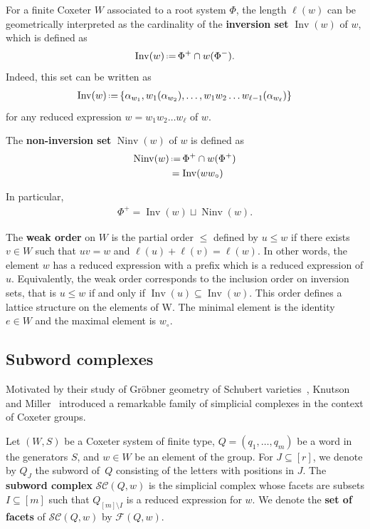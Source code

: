 \documentclass{amsart}
\theoremstyle{definition}
\newcommand{\eqdef}{\mbox{\,\raisebox{0.2ex}{\scriptsize\ensuremath{\mathrm:}}\ensuremath{=}\,}} %
\DeclareMathOperator{\Inv}{Inv} %
\DeclareMathOperator{\Ninv}{Ninv} %
\newcommand{\defn}[1]{\textbf{\textsf{\color{PineGreen} #1}}} %
\newcommand{\cesar}[1]{\todo[color=orange!30,inline]{#1 \\ \hfill --- C.}}
\newcommand{\wo}{w_\circ} %
\newcommand{\subwordComplex}{\mathcal{SC}} %
\newcommand{\subwordFacets}{\mathcal{F}} %
\begin{document}
For a finite Coxeter $W$ associated to a root system $\Phi$, the length $\ell(w)$ can be geometrically interpreted as the cardinality of the \defn{inversion set} $\Inv(w)$ of $w$, which is defined as
\begin{align}\label{def_inversionset}
\Inv(w) \eqdef \Phi^+ \cap w(\Phi^-).
\end{align}
Indeed, this set can be written as 
\begin{align}\label{def_inversionset2}
\Inv(w) \eqdef \{\alpha_{w_1}, w_1(\alpha_{w_2}),\dots , w_1w_2\dots w_{\ell-1}(\alpha_{w_\ell})\}
\end{align}
for any reduced expression $w=w_1w_2\dots w_\ell$ of $w$.

The \defn{non-inversion set} $\Ninv (w)$ of $w$ is defined as
\begin{align}
\Ninv(w) & \eqdef \Phi^+ \cap w(\Phi^+) \label{def_noninversionset} \\
& =\Inv(w\wo)
\end{align}

In particular, 
\begin{align}
\Phi^+=\Inv(w) \sqcup \Ninv (w).
\end{align}

The \defn{weak order} on $W$ is the partial order $\leq$ defined by $u \leq w$ if there exists $v \in W$ such that $uv = w$ and $\ell(u) + \ell(v) = \ell(w)$.
In other words, the element $w$ has a reduced expression with a prefix which is a reduced expression of $u$.
Equivalently, the weak order corresponds to the inclusion order on inversion sets, that is $u \leq w$ if and only if $\Inv(u) \subseteq \Inv(w)$.
This order defines a lattice structure on the elements of W.
The minimal element is the identity $e \in W$ and the maximal element is $\wo$.


\subsection{Subword complexes}

Motivated by their study of Gröbner geometry of Schubert varieties~\cite{KnutsonMiller-GroebnerGeometry}, Knutson and Miller~\cite{KnutsonMiller-subwordComplex} introduced a remarkable family of simplicial complexes in the context of Coxeter groups.

Let $(W,S)$ be a Coxeter system of finite type, $Q=(q_1,\dots,q_m)$ be a word in the generators $S$, and $w\in W$ be an element of the group.
For $J\subseteq [r]$, we denote by $Q_J$ the subword of~$Q$ consisting of the letters with positions in $J$.
The \defn{subword complex} $\subwordComplex(Q,w)$ is the simplicial complex whose facets are subsets $I\subseteq [m]$ such that $Q_{[m]\setminus I}$ is a reduced expression for $w$.
We denote the \defn{set of facets} of $\subwordComplex(Q,w)$ by $\subwordFacets(Q,w)$.
\end{document}
